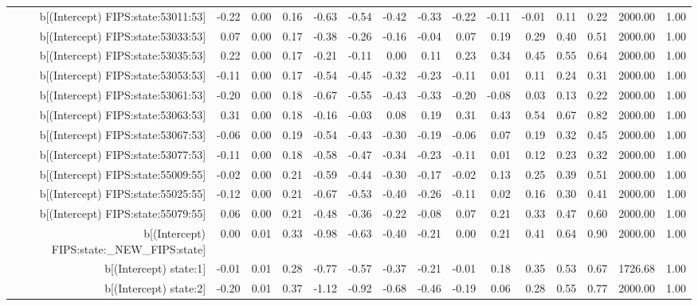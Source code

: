 \begin{table}[ht]
\begin{tabular}{rrrrrrrrrrrrrrr}
  b[(Intercept) FIPS:state:53011:53] & -0.22 & 0.00 & 0.16 & -0.63 & -0.54 & -0.42 & -0.33 & -0.22 & -0.11 & -0.01 & 0.11 & 0.22 & 2000.00 & 1.00 \\ 
  b[(Intercept) FIPS:state:53033:53] & 0.07 & 0.00 & 0.17 & -0.38 & -0.26 & -0.16 & -0.04 & 0.07 & 0.19 & 0.29 & 0.40 & 0.51 & 2000.00 & 1.00 \\ 
  b[(Intercept) FIPS:state:53035:53] & 0.22 & 0.00 & 0.17 & -0.21 & -0.11 & 0.00 & 0.11 & 0.23 & 0.34 & 0.45 & 0.55 & 0.64 & 2000.00 & 1.00 \\ 
  b[(Intercept) FIPS:state:53053:53] & -0.11 & 0.00 & 0.17 & -0.54 & -0.45 & -0.32 & -0.23 & -0.11 & 0.01 & 0.11 & 0.24 & 0.31 & 2000.00 & 1.00 \\ 
  b[(Intercept) FIPS:state:53061:53] & -0.20 & 0.00 & 0.18 & -0.67 & -0.55 & -0.43 & -0.33 & -0.20 & -0.08 & 0.03 & 0.13 & 0.22 & 2000.00 & 1.00 \\ 
  b[(Intercept) FIPS:state:53063:53] & 0.31 & 0.00 & 0.18 & -0.16 & -0.03 & 0.08 & 0.19 & 0.31 & 0.43 & 0.54 & 0.67 & 0.82 & 2000.00 & 1.00 \\ 
  b[(Intercept) FIPS:state:53067:53] & -0.06 & 0.00 & 0.19 & -0.54 & -0.43 & -0.30 & -0.19 & -0.06 & 0.07 & 0.19 & 0.32 & 0.45 & 2000.00 & 1.00 \\ 
  b[(Intercept) FIPS:state:53077:53] & -0.11 & 0.00 & 0.18 & -0.58 & -0.47 & -0.34 & -0.23 & -0.11 & 0.01 & 0.12 & 0.23 & 0.32 & 2000.00 & 1.00 \\ 
  b[(Intercept) FIPS:state:55009:55] & -0.02 & 0.00 & 0.21 & -0.59 & -0.44 & -0.30 & -0.17 & -0.02 & 0.13 & 0.25 & 0.39 & 0.51 & 2000.00 & 1.00 \\ 
  b[(Intercept) FIPS:state:55025:55] & -0.12 & 0.00 & 0.21 & -0.67 & -0.53 & -0.40 & -0.26 & -0.11 & 0.02 & 0.16 & 0.30 & 0.41 & 2000.00 & 1.00 \\ 
  b[(Intercept) FIPS:state:55079:55] & 0.06 & 0.00 & 0.21 & -0.48 & -0.36 & -0.22 & -0.08 & 0.07 & 0.21 & 0.33 & 0.47 & 0.60 & 2000.00 & 1.00 \\ 
  b[(Intercept) FIPS:state:\_NEW\_FIPS:state] & 0.00 & 0.01 & 0.33 & -0.98 & -0.63 & -0.40 & -0.21 & 0.00 & 0.21 & 0.41 & 0.64 & 0.90 & 2000.00 & 1.00 \\ 
  b[(Intercept) state:1] & -0.01 & 0.01 & 0.28 & -0.77 & -0.57 & -0.37 & -0.21 & -0.01 & 0.18 & 0.35 & 0.53 & 0.67 & 1726.68 & 1.00 \\ 
  b[(Intercept) state:2] & -0.20 & 0.01 & 0.37 & -1.12 & -0.92 & -0.68 & -0.46 & -0.19 & 0.06 & 0.28 & 0.55 & 0.77 & 2000.00 & 1.00 \\ 

\end{tabular}
\end{table}
